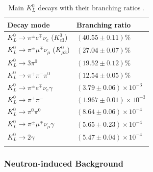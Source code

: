 


\begin{table} [h]
\centering
\caption{Main $K_L^0$ decays with their branching ratios \parencite{PDG18} . }
\label{tab:KL_decay}
%
\small
\begin{tabular}{l l}
\dtoprule
\rowcolor{LightCyan}
Decay mode & Branching ratio \\
\midrule[0.5pt]
$K_L^0 \rightarrow \pi^{\pm} e^{\mp} \nu_e$ ($K_{e3}^0$) & $(40.55 \pm 0.11) \%$ \\
$K_L^0 \rightarrow \pi^{\pm} \mu^{\mp} \nu_{\mu}$ ($K_{\mu 3}^0$) & $(27.04 \pm 0.07) \%$  \\
$K_L^0 \rightarrow 3 \pi^0$ & $(19.52 \pm 0.12) \%$ \\
$K_L^0 \rightarrow \pi^+ \pi^- \pi^0$ & $(12.54 \pm 0.05) \%$  \\
$K_L^0 \rightarrow \pi^{\pm} e^{\mp} \nu_e \gamma$ & $(3.79 \pm 0.06) \times 10^{-3}$ \\
$K_L^0 \rightarrow \pi^+ \pi^-$ & $(1.967 \pm 0.01) \times 10^{-3}$ \\
$K_L^0 \rightarrow \pi^0 \pi^0$ & $(8.64 \pm 0.06) \times 10^{-4}$ \\
$K_L^0 \rightarrow \pi^{\pm} \mu^{\mp} \nu_{\mu} \gamma$ & $(5.65 \pm 0.23) \times 10^{-4}$ \\
$K_L^0 \rightarrow 2 \gamma$ & $(5.47 \pm 0.04) \times 10^{-4}$ \\
\dbottomrule
\end{tabular}
%
\end{table}


\subsubsection{Neutron-induced Background}

